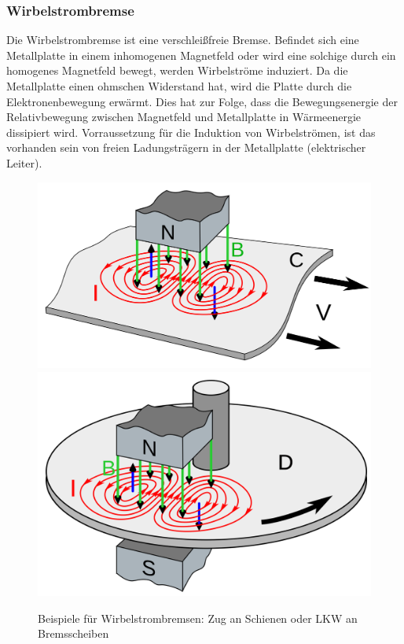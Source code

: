 		\subsubsection*{Wirbelstrombremse}
			Die Wirbelstrombremse ist eine verschleißfreie Bremse. Befindet sich eine Metallplatte in einem inhomogenen Magnetfeld oder wird eine solchige durch ein homogenes Magnetfeld bewegt, werden Wirbelströme induziert. Da die Metallplatte einen ohmschen Widerstand hat, wird die Platte durch die Elektronenbewegung erwärmt. Dies hat zur Folge, dass die Bewegungsenergie der Relativbewegung zwischen Magnetfeld und Metallplatte in Wärmeenergie dissipiert wird. Vorraussetzung für die Induktion von Wirbelströmen, ist das vorhanden sein von freien Ladungsträgern in der Metallplatte (elektrischer Leiter).
			\begin{figure}[h]
				\centering
				\includegraphics[width=0.49\linewidth]{./pics/el/wirbelbrems1}
				\includegraphics[width=0.49\linewidth]{./pics/el/wirbelbrems2}
				\caption{Beispiele für Wirbelstrombremsen: Zug an Schienen oder LKW an Bremsscheiben}
			\end{figure}
	
